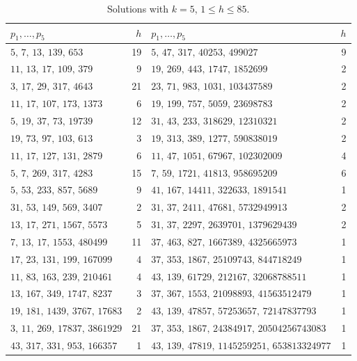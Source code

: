 \documentclass[screen,reqno]{aomart}
\numberwithin{equation}{section}
\theoremstyle{plain}
\theoremstyle{definition}
\theoremstyle{remark}
\begin{document}
\begin{table}[ht]
\centering
\caption{Solutions with $k=5$, $1\le h\le85$.}
\label{tab:S5}
\smallskip
\footnotesize
\begin{tabular}{@{}lr@{\qquad}lr@{}}
\toprule
$p_1,\dots,p_5$ & $h$ & $p_1,\dots,p_5$ & $h$ \\
\midrule
$5,\,7,\,13,\,139,\,653$ & 19 & $5,\,47,\,317,\,40253,\,499027$ & 9 \\
$11,\,13,\,17,\,109,\,379$ & 9 & $19,\,269,\,443,\,1747,\,1852699$ & 2 \\
$3,\,17,\,29,\,317,\,4643$ & 21 & $23,\,71,\,983,\,1031,\,103437589$ & 2 \\
$11,\,17,\,107,\,173,\,1373$ & 6 & $19,\,199,\,757,\,5059,\,23698783$ & 2 \\
$5,\,19,\,37,\,73,\,19739$ & 12 & $31,\,43,\,233,\,318629,\,12310321$ & 2 \\
$19,\,73,\,97,\,103,\,613$ & 3 & $19,\,313,\,389,\,1277,\,590838019$ & 2 \\
$11,\,17,\,127,\,131,\,2879$ & 6 & $11,\,47,\,1051,\,67967,\,102302009$ & 4 \\
$5,\,7,\,269,\,317,\,4283$ & 15 & $7,\,59,\,1721,\,41813,\,958695209$ & 6 \\
$5,\,53,\,233,\,857,\,5689$ & 9 & $41,\,167,\,14411,\,322633,\,1891541$ & 1 \\
$31,\,53,\,149,\,569,\,3407$ & 2 & $31,\,37,\,2411,\,47681,\,5732949913$ & 2 \\
$13,\,17,\,271,\,1567,\,5573$ & 5 & $31,\,37,\,2297,\,2639701,\,1379629439$ & 2 \\
$7,\,13,\,17,\,1553,\,480499$ & 11 & $37,\,463,\,827,\,1667389,\,4325665973$ & 1 \\
$17,\,23,\,131,\,199,\,167099$ & 4 & $37,\,353,\,1867,\,25109743,\,844718249$ & 1 \\
$11,\,83,\,163,\,239,\,210461$ & 4 & $43,\,139,\,61729,\,212167,\,32068788511$ & 1 \\
$13,\,167,\,349,\,1747,\,8237$ & 3 & $37,\,367,\,1553,\,21098893,\,41563512479$ & 1 \\
$19,\,181,\,1439,\,3767,\,17683$ & 2 & $43,\,139,\,47857,\,57253657,\,72147837793$ & 1 \\
$3,\,11,\,269,\,17837,\,3861929$ & 21 & $37,\,353,\,1867,\,24384917,\,20504256743083$ & 1 \\
$43,\,317,\,331,\,953,\,166357$ & 1 & $43,\,139,\,47819,\,1145259251,\,653813324977$ & 1 \\
\bottomrule
\end{tabular}
\end{table}
\end{document}
